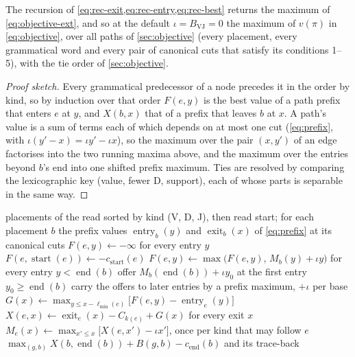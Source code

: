\documentclass[11pt,a4paper]{article}
\begin{document}
\begin{theorem}
\label{thm:dag}
The recursion of \cref{eq:rec-exit,eq:rec-entry,eq:rec-best} returns the
maximum of \cref{eq:objective-ext}, and so at the default
$\iota=B_{\mathrm{VJ}}=0$ the maximum of $v(\pi)$ in \cref{eq:objective},
over all paths of \cref{sec:objective} (every placement, every grammatical
word and every pair of canonical cuts that satisfy its conditions 1--5),
with the tie order of \cref{sec:objective}.
\end{theorem}
\begin{proof}[Proof sketch]
Every grammatical predecessor of a node precedes it in the order by kind, so
by induction over that order $F(e,y)$ is the best value of a path prefix
that enters $e$ at $y$, and $X(b,x)$ that of a prefix that leaves $b$ at $x$.
A path's value is a sum of terms each of which depends on at most one cut
(\cref{eq:prefix}, with $\iota(y'-x)=\iota y'-\iota x$), so the maximum over
the pair $(x,y')$ of an edge factorises into the two running maxima above,
and the maximum over the entries beyond $b$'s end into one shifted prefix
maximum. Ties are resolved by comparing the lexicographic key
(value, fewer D, support), each of whose parts is separable in the same way.
\end{proof}

\begin{algorithm}[t]
\caption{Exact adjudication of one read. The posterior pass runs the same
loop in the sum-product semiring, with prefix sums in place of running
maxima.}
\label{alg:dag}
\small
\begin{algorithmic}[1]
\Require placements of the read sorted by kind (V, D, J), then read start;
  for each placement $b$ the prefix values $\operatorname{entry}_b(y)$ and
  $\operatorname{exit}_b(x)$ of \cref{eq:prefix} at its canonical cuts
  \State $F(e,y)\gets-\infty$ for every entry $y$
    \State $F(e,\operatorname{start}(e))\gets -c_{\text{start}}(e)$
  \EndIf
    \State $F(e,y)\gets\max\bigl(F(e,y),\,M_b(y)+\iota y\bigr)$ for every entry $y<\operatorname{end}(b)$
    \State offer $M_b(\operatorname{end}(b))+\iota y_0$ at the first entry $y_0\ge\operatorname{end}(b)$
  \EndFor
  \State carry the offers to later entries by a prefix maximum, $+\iota$ per base
  \State $G(x)\gets\max_{y\le x-\ell_{\min}(e)}\bigl[F(e,y)-\operatorname{entry}_e(y)\bigr]$ 
  \State $X(e,x)\gets\operatorname{exit}_e(x)-C_{k(e)}+G(x)$ for every exit $x$
  \State $M_e(x)\gets\max_{x'\le x}\bigl[X(e,x')-\iota x'\bigr]$, once per kind that may follow $e$
\EndFor
\State \Return $\max_{(g,b)} X(b,\operatorname{end}(b))+B(g,b)-c_{\text{end}}(b)$ and its trace-back
\end{algorithmic}
\end{algorithm}
\end{document}

